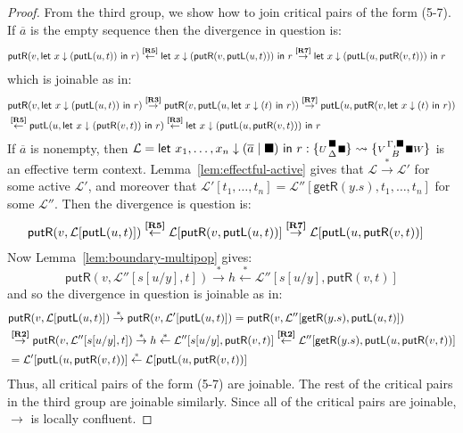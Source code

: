\documentclass[twoside,11pt,final]{entics}
\newcommand{\putr}{\mathsf{putR}}
\newcommand{\getr}{\mathsf{getR}}
\newcommand{\putl}{\mathsf{putL}}
\newcommand{\wiggle}[4]{\{{\scriptstyle #1} {{\scriptstyle #2} \atop {\scriptstyle #3}} {\scriptstyle #4}\}}
\newcommand{\from}{\leftarrow}
\newcommand{\asn}{\downarrow}
\newcommand{\seq}{,\!\ldots\!,}
\begin{document}
\begin{proof}
From the third group, we show how to join critical pairs of the form (5-7). If $\overline{a}$ is the empty sequence then the divergence in question is:
\begin{align*}
  & \putr(v,\textsf{let } x \asn (\putl(u,t)) \textsf{ in } r)
    \overset{\text{\bf[R5]}}{\from} \textsf{let } x \asn (\putr(v,\putl(u,t))) \textsf{ in } r
    \overset{\text{\bf[R7]}}{\to} \textsf{let } x \asn (\putl(u,\putr(v,t))) \textsf{ in } r
\end{align*}
which is joinable as in:
\begin{align*}
  & \putr(v,\textsf{let } x \asn (\putl(u,t)) \textsf{ in } r)
    \overset{\text{\bf[R3]}}{\to} \putr(v,\putl(u,\textsf{let } x \asn (t) \textsf{ in } r))
    \overset{\text{\bf[R7]}}{\to} \putl(u,\putr(v,\textsf{let } x \asn (t) \textsf{ in } r))
  \\& \overset{\text{\bf[R5]}}{\from} \putl(u,\textsf{let } x \asn (\putr(v,t)) \textsf{ in } r)
  \overset{\text{\bf[R3]}}{\from} \textsf{let } x \asn (\putl(u,\putr(v,t))) \textsf{ in } r
\end{align*}
If $\overline{a}$ is nonempty, then $\mathcal{L} = \textsf{let } x_1,\ldots,x_n \asn (\overline{a} \mid \blacksquare) \textsf{ in } r : \wiggle{U}{\blacksquare}{\Delta}{\blacksquare} \rightsquigarrow \wiggle{V}{\Gamma,\blacksquare}{B}{\blacksquare W}$ is an effective term context. Lemma~\ref{lem:effectful-active} gives that $\mathcal{L} \stackrel{*}{\to} \mathcal{L}'$ for some active $\mathcal{L}'$, and moreover that $\mathcal{L}'[t_1 \seq t_n] = \mathcal{L}''[\getr(y.s) , t_1 \seq t_n]$ for some $\mathcal{L}''$. Then the divergence is question is:
\begin{align*}
  & \putr(v,\mathcal{L}[\putl(u,t)])
    \overset{\text{\bf[R5]}}{\from} \mathcal{L}[\putr(v,\putl(u,t))]
    \overset{\text{\bf[R7]}}{\to} \mathcal{L}[\putl(u,\putr(v,t))]
\end{align*}
Now Lemma~\ref{lem:boundary-multipop} gives:
\[
\putr(v,\mathcal{L}''[s[u/y], t])
  \stackrel{*}{\to} h
  \stackrel{*}{\from} \mathcal{L}''[s[u/y] , \putr(v,t)]
\]
and so the divergence in question is joinable as in:
\begin{align*}
  & \putr(v,\mathcal{L}[\putl(u,t)])
    \stackrel{*}{\to} \putr(v,\mathcal{L}'[\putl(u,t)])
    = \putr(v,\mathcal{L}''[\getr(y.s), \putl(u,t)])
  \\& \overset{\text{\bf[R2]}}{\to} \putr(v,\mathcal{L}''[s[u/y], t])
  \stackrel{*}{\to} h
  \stackrel{*}{\from} \mathcal{L}''[s[u/y] , \putr(v,t)]
  \overset{\text{\bf[R2]}}{\from} \mathcal{L}''[\getr(y.s) , \putl(u,\putr(v,t))]
  \\& = \mathcal{L}'[\putl(u,\putr(v,t))]
  \stackrel{*}{\from} \mathcal{L}[\putl(u,\putr(v,t))]
\end{align*}
Thus, all critical pairs of the form (5-7) are joinable. The rest of the critical pairs in the third group are joinable similarly. Since all of the critical pairs are joinable, $\to$ is locally confluent.
\end{proof}
\end{document}
